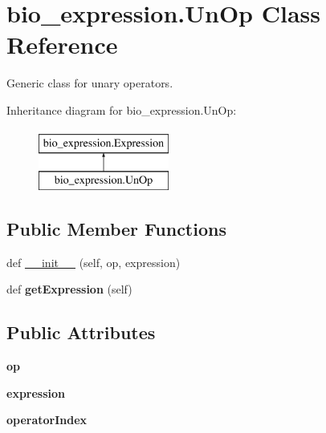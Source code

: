 \hypertarget{classbio__expression_1_1_un_op}{}\section{bio\+\_\+expression.\+Un\+Op Class Reference}
\label{classbio__expression_1_1_un_op}


Generic class for unary operators.  


Inheritance diagram for bio\+\_\+expression.\+Un\+Op\+:\begin{figure}[H]
\begin{center}
\leavevmode
\includegraphics[height=2.000000cm]{classbio__expression_1_1_un_op}
\end{center}
\end{figure}
\subsection*{Public Member Functions}
\begin{DoxyCompactItemize}
\item 
def \hyperlink{classbio__expression_1_1_un_op_a125ba171fac08212a166b1d91b16223b}{\+\_\+\+\_\+init\+\_\+\+\_\+} (self, op, expression)
\item 
def {\bfseries get\+Expression} (self)\hypertarget{classbio__expression_1_1_un_op_a796d06d0718b8639dcdab4e13e462dc8}{}\label{classbio__expression_1_1_un_op_a796d06d0718b8639dcdab4e13e462dc8}

\end{DoxyCompactItemize}
\subsection*{Public Attributes}
\begin{DoxyCompactItemize}
\item 
{\bfseries op}\hypertarget{classbio__expression_1_1_un_op_a2790ba638c53bee9402c6ed762f0b919}{}\label{classbio__expression_1_1_un_op_a2790ba638c53bee9402c6ed762f0b919}

\item 
{\bfseries expression}\hypertarget{classbio__expression_1_1_un_op_a33f0fb23ad12aea397027bc0276081dc}{}\label{classbio__expression_1_1_un_op_a33f0fb23ad12aea397027bc0276081dc}

\item 
{\bfseries operator\+Index}\hypertarget{classbio__expression_1_1_un_op_aa7c4a48c299e7b44e49d3f7a68fa40ec}{}\label{classbio__expression_1_1_un_op_aa7c4a48c299e7b44e49d3f7a68fa40ec}

\end{DoxyCompactItemize}


